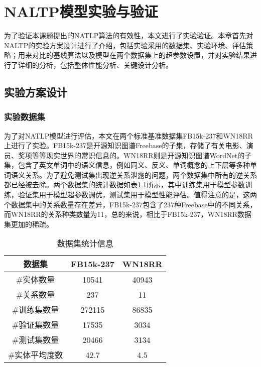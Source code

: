 \chapter{NALTP模型实验与验证}

为了验证本课题提出的NATLP算法的有效性，本文进行了实验验证。本章首先对NALTP的实验方案设计进行了介绍，包括实验采用的数据集、实验环境、评估策略；用来对比的基线算法以及模型在两个数据集上的超参数设置，并对实验结果进行了详细的分析，包括整体性能分析、关键设计分析。

\section{实验方案设计}

\subsection{实验数据集}
为了对NATLP模型进行评估，本文在两个标准基准数据集FB15k-237和WN18RR上进行了实验。FB15k-237是开源知识图谱Freebase的子集，存储了有关电影、演员、奖项等等现实世界的常识信息的。WN18RR则是开源知识图谱WordNet的子集，包含了英文单词中的语义信息，例如同义、反义、单词概念的上下层等多种单词语义关系。为了避免测试集出现逆关系泄露的问题，两个数据集中所有的逆关系都已经被去除。两个数据集的统计数据如表\ref{dataset_statistics}所示，其中训练集用于模型参数训练，验证集用于模型超参数调优，测试集用于模型性能评估。值得注意的是，这两个数据集中的关系数量存在差异，FB15k-237包含了237种Freebase中的不同关系，而WN18RR的关系种类数量为11，总的来说，相比于FB15k-237，WN18RR数据集更加的稀疏。

\begin{table}[htbp]
  \renewcommand\arraystretch{1.5}
  \caption{数据集统计信息}
  \centering
  \begin{tabular}{*{3}{c}}
    \toprule
    数据集 & FB15k-237 & WN18RR\\
    \midrule
    \#实体数量  & 10541 & 40943 \\
    \#关系数量 & 237 & 11\\
    \#训练集数量 & 272115 &86835\\
    \#验证集数量 &17535 &3034\\
    \#测试集数量 &20466 &3134\\
    \#实体平均度数 &42.7 &4.5\\
    \bottomrule
  \end{tabular}
  \label{dataset_statistics}
\end{table}

